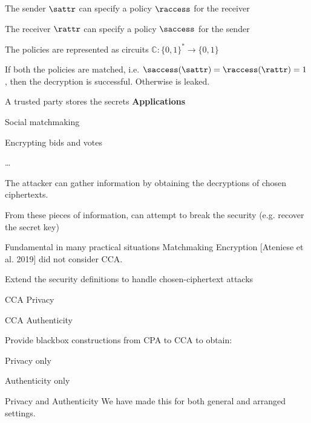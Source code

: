 \startslide[title={ABE: an example}]
\stopslide

\item The sender $\sattr$ can specify a policy $\raccess$ for the receiver
\item The receiver $\rattr$ can specify a policy $\saccess$ for the sender
\item The policies are represented as circuits $\mathbb{C}:\{0, 1\}^* \to \{0, 1\}$
\item If both the policies are matched, i.e. $\saccess(\sattr) = \raccess(\rattr) = 1$, then the decryption is successful. Otherwise  is leaked.
\item A trusted party stores the secrets
\stopitemize
{\bf Applications}
\item Social matchmaking
\item Encrypting bids and votes
\item \dots
\stopitemize
\stopslide

\startslide[title={ME: an example}]
\externalfigure[images/me][horizontal]
\stopslide

\startslide[title={Chosen-Ciphertext Attacks}]
\startitemize
\item The attacker can gather information by obtaining the decryptions of chosen ciphertexts.
\item From these pieces of information, can attempt to break the security (e.g. recover the secret key)
\item Fundamental in many practical situations
\stopitemize
{\important Matchmaking Encryption [Ateniese et al. 2019] did not consider CCA.}
\stopslide

\startslide[title={Thesis Contributions}]
\startitemize[n]
\item Extend the security definitions to handle chosen-ciphertext attacks
\startitemize[1, packed]
\item CCA Privacy
\item CCA Authenticity
\stopitemize
\item Provide blackbox constructions from CPA to CCA to obtain:
\startitemize[1, packed]
\item Privacy only
\item Authenticity only
\item Privacy and Authenticity
\stopitemize
\stopitemize
{\important We have made this for both {\underbar general} and {\underbar arranged} settings.}
\stopslide

